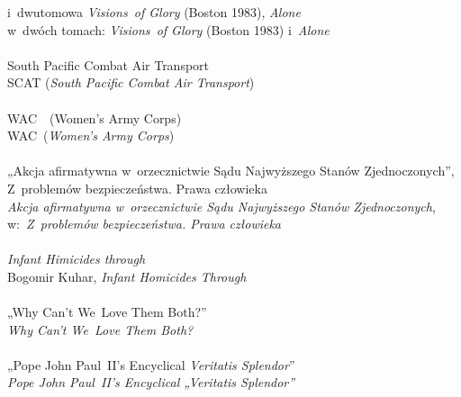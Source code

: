 \documentclass[a4paper,11pt]{article}
\numberwithin{equation}{section}
\begin{document}
\Jest i~dwutomowa \textit{Visions~of Glory} (Boston 1983),
\textit{Alone} \\
\PowinnoByc w~dwóch tomach: \textit{Visions~of Glory} (Boston 1983)
i~\textit{Alone} \\
 \\
\Jest South Pacific Combat Air Transport \\
\PowinnoByc SCAT (\textit{South Pacific Combat Air Transport}) \\
 \\
\Jest WAC~~(Women's Army Corps) \\
\PowinnoByc WAC~(\textit{Women's Army Corps}) \\
 \\
\Jest „Akcja afirmatywna w~orzecznictwie Sądu Najwyższego Stanów
Zjednoczonych”, Z~problemów bezpieczeństwa. Prawa człowieka \\
\PowinnoByc \textit{Akcja afirmatywna w~orzecznictwie Sądu Najwyższego
  Stanów Zjednoczonych}, w:~\textit{Z~problemów bezpieczeństwa. Prawa
  człowieka} \\
 \\
\Jest \textit{Infant Himicides through} \\
\PowinnoByc Bogomir Kuhar, \textit{Infant Homicides Through} \\
 \\
\Jest „Why Can't We~Love Them Both?” \\
\PowinnoByc \textit{Why Can't We~Love Them Both?} \\
 \\
\Jest „Pope John Paul~II's Encyclical \textit{Veritatis Splendor}” \\
\PowinnoByc \textit{Pope John Paul~II's Encyclical „Veritatis Splendor”} \\































\printbibliography





\end{document}

